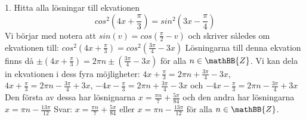 \documentclass{article}
\begin{document}
  1. Hitta alla lösningar till ekvationen
  \begin{equation}
      cos^2(4x + \frac{\pi}{3}) = sin^2(3x-\frac{\pi}{4})
  \end{equation}
  Vi börjar med notera att $sin(v) = cos(\frac{\pi}{2} - v)$ och skriver således om ekvationen till: \newline\newline
  $cos^2(4x + \frac{\pi}{3}) = cos^2(\frac{3\pi}{4} - 3x)$\newline\newline
  Lösningarna till denna ekvation finns då $\pm (4x + \frac{\pi}{3}) = 2\pi n \pm (\frac{3\pi}{4} - 3x)$ för alla $n \in \mathBB{Z}$. Vi kan dela in ekvationen i dess fyra möjligheter:\newline\newline
  $4x + \frac{\pi}{3} = 2\pi n + \frac{3\pi}{4} - 3x$, $4x + \frac{\pi}{3} = 2\pi n - \frac{3\pi}{4} + 3x$, $-4x - \frac{\pi}{3} = 2\pi n + \frac{3\pi}{4} - 3x$ och $-4x - \frac{\pi}{3} = 2\pi n - \frac{3\pi}{4} + 3x$\newline\newline
  Den första av dessa har lösnignarna $x = \frac{\pi n}{7} + \frac{5\pi}{84}$ och den andra har lösningarna $x = \pi n - \frac{13\pi}{12}$\newline\newline
  Svar: $x = \frac{\pi n}{7} + \frac{5\pi}{84}$ eller $x = \pi n - \frac{13\pi}{12}$ för alla $n \in \mathBB{Z}$.
  \newline \newline
  
\end{document}
